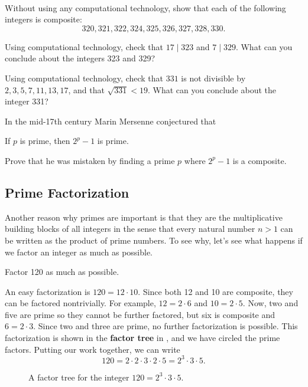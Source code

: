 \begin{act}
\label{act_prime_composite}
~
    \begin{actpart}
        \item Without using any computational technology, show that each of the following integers is composite:
        $$320, 321, 322, 324, 325, 326, 327, 328, 330.$$
        \item Using computational technology, check that $17 \mid 323$ and $7 \mid 329$. What can you conclude about the integers 323 and 329?
        \item Using computational technology, check that $331$ is not divisible by $2, 3, 5, 7, 11, 13, 17$, and that $\sqrt{331} < 19$. What can you conclude about the integer 331?
        \item \label{part_mersenne_was_mistaken} In the mid-17th century Marin Mersenne conjectured that     \begin{center}
                If $p$ is prime, then $2^p-1$ is prime.
            \end{center}
        Prove that he was mistaken by finding a prime $p$ where $2^p-1$ is a composite.
    \end{actpart}
\end{act}
 
\newcommand{\subprimefact}{Prime Factorization}
\subsection{\subprimefact}
\label{sub_prime_fact}

Another reason why primes are important is that they are the multiplicative building blocks of all integers in the sense that every natural number $n > 1$ can be written as the product of prime numbers. To see why, let's see what happens if we factor an integer as much as possible.

\begin{exam}[Factoring 120]
\label{exam_factor120}
    Factor 120 as much as possible.
        \begin{soln}
            An easy factorization is $120 = 12 \cdot 10$.  Since both 12 and 10 are composite, they can be factored nontrivially.  For example, $12 = 2 \cdot 6$ and $10 = 2 \cdot 5$.  Now, two and five are prime so they cannot be further factored, but six is composite and $6 = 2 \cdot 3$.  Since two and three are prime, no further factorization is possible.  This factorization is shown in the \textbf{factor tree} in , and we have circled the prime factors.  Putting our work together, we can write $$ 120 = 2 \cdot 2 \cdot 3 \cdot 2 \cdot 5 = 2^3 \cdot 3 \cdot 5.$$
        \end{soln}
    \begin{figure}[hbtp]
        \centering           
        
        \caption{A factor tree for the integer $120=2^3 \cdot 3 \cdot 5$.}
        \label{figure_factoring120}
    \end{figure}
\end{exam}

